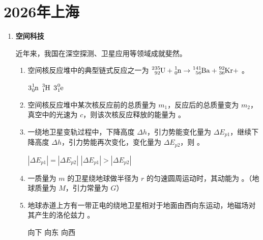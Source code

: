 \documentclass[\gkver]{gaokaozhenti}
\begin{document}
\chapter{2026年上海}

\begin{enumerate}
\item
\textbf{空间科技}

近年来，我国在深空探测、卫星应用等领域成就斐然。
\begin{enumerate}
	\item
	空间核反应堆中的典型链式反应之一为 $\ce{^{235}_{92}U} + \ce{^{1}_{0}n} \to \ce{^{141}_{56}Ba} + \ce{^{92}_{36}Kr} +$ 。

	{$3\ce{^{1}_{0}n}$}
	{$\ce{^{3}_{1}H}$}
	{$3\ce{^{0}_{1}e}$}

	\item
	空间核反应堆中某次核反应前的总质量为 $m_{1}$，反应后的总质量变为 $m_{2}$，真空中的光速为 $c$，则该次核反应释放的能量为 。

	\item
	一绕地卫星变轨过程中，下降高度 $\Delta h$，引力势能变化量为 $\Delta E_{p1}$，继续下降高度 $\Delta h$，引力势能再次变化，变化量为 $\Delta E_{p2}$，则 。

	{$|\Delta E_{p1}| = |\Delta E_{p2}|$}
	{$|\Delta E_{p1}| > |\Delta E_{p2}|$}

	\item
	一质量为 $m$ 的卫星绕地球做半径为 $r$ 的匀速圆周运动时，其动能为 。（地球质量为 $M$，引力常量为 $G$）

	\item
	地球赤道上方有一带正电的绕地卫星相对于地面由西向东运动，地磁场对其产生的洛伦兹力 。

	{向下}
	{向东}
	{向西}
\end{enumerate}
\end{enumerate}
\end{document}
